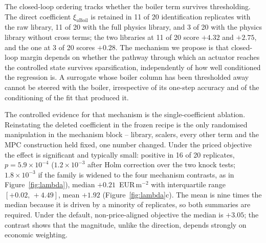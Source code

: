 The closed-loop ordering tracks whether the boiler term survives thresholding. The
direct coefficient $\xi_{u\text{Boil}}$ is retained in 11 of 20
identification replicates with the raw library, 11 of 20 with the full physics
library, and 3 of 20 with the physics library without cross terms; the two
libraries at 11 of 20 score $+4.32$ and $+2.75$, and the one at 3 of 20 scores
$+0.28$.
The mechanism we propose is that closed-loop margin depends on whether the pathway
through which an actuator reaches the controlled state survives sparsification,
independently of how well conditioned the regression is. A surrogate whose boiler
column has been thresholded away cannot be steered with the boiler, irrespective of
its one-step accuracy and of the conditioning of the fit that produced it.

The controlled evidence for that mechanism is the single-coefficient ablation.
Reinstating the deleted
coefficient in the frozen recipe is the only randomised manipulation in the
mechanism block -- library, scalers, every other term and the MPC construction held
fixed, one number changed. Under the priced objective the effect is significant and
typically small: positive in 16 of 20 replicates, $p=5.9\times10^{-4}$
($1.2\times10^{-3}$ after Holm correction over the two knock tests; $1.8\times10^{-3}$
if the family is widened to the four mechanism contrasts, as in
Figure~\ref{fig:lambda}), median $+0.21$~EUR\,m$^{-2}$ with
interquartile range $[+0.02,\,+4.49]$, mean $+1.92$ (Figure~\ref{fig:lambda}c).
The mean is nine times the median because it is driven by a minority of replicates, so
both summaries are required. Under the default, non-price-aligned objective the median is
$+3.05$; the contrast shows that the magnitude, unlike the direction, depends strongly
on economic weighting.

